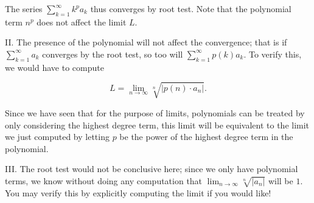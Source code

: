 \documentclass[noauthor,handout]{ximera}
\begin{document}
\begin{problem}
\begin{freeResponse}
The series $\sum_{k=1}^{\infty} k^p a_k$ thus converges by root test.  Note that the polynomial term $n^p$ does not affect the limit $L$.

II. The presence of the polynomial will not affect the convergence; that is if  $\sum_{k=1}^{\infty} a_k$ converges by the root test, so too will $\sum_{k=1}^{\infty} p(k) a_k$.  To verify this, we would have to compute 

\[
L = \lim_{n \to \infty}\sqrt[n]{ \left|p(n) \cdot a_n\right|} .
\]

Since we have seen that for the purpose of limits, polynomials can be treated by only considering the highest degree term, this limit will be equivalent to the limit we just computed by letting $p$ be the power of the highest degree term in the polynomial.

III. The root test would not be conclusive here; since we only have polynomial terms, we know without doing any computation that $\lim_{n \to \infty}\sqrt[n]{ \left|a_n\right|}$ will be $1$.  You may verify this by explicitly computing the limit if you would like!

\end{freeResponse}
\end{problem}
\end{document}
